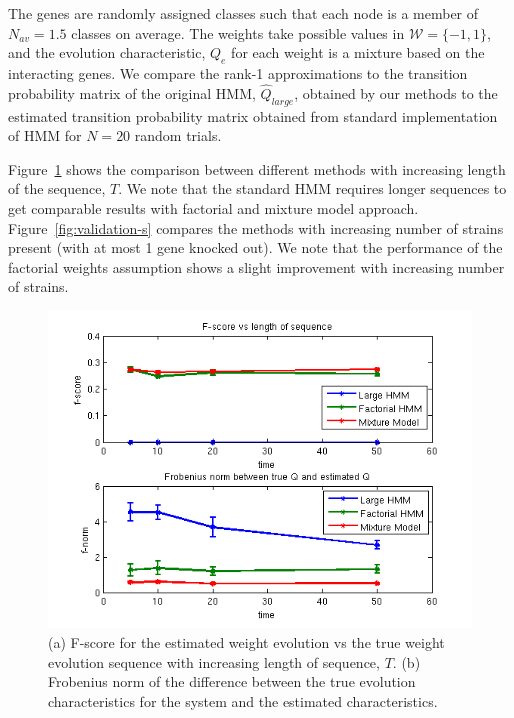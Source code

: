 \documentclass{bioinfo}
\begin{document}
The genes are randomly assigned classes  such that each
node is a member of $N_{av}=1.5$ classes on average. The weights take
possible values in ${\mathcal W} = \{-1, 1\}$, and the evolution characteristic, $Q_{e}$ for
each weight is a mixture based on the interacting genes.  We compare
the rank-1 approximations to the transition probability matrix of the
original HMM, $\hat{Q}_{large}$,  obtained by our methods to the
estimated transition probability matrix obtained from standard implementation of 
HMM for $N=20$ random trials. 

Figure~\ref{fig:validation-t} shows the comparison between different
methods with increasing length of the sequence, $T$. We note that the
standard HMM requires longer sequences to get comparable results with
factorial and mixture model approach. Figure~\ref{fig:validation-s} compares the
methods with increasing number of strains present (with at most 1 gene
knocked out). We note that the performance of the factorial weights
assumption shows a slight improvement with increasing number of
strains. 
\begin{figure}[h]
  \centering
  \includegraphics[scale=0.6]{results/mm_tvar}
  \caption{(a) F-score for the estimated weight evolution vs the true
    weight evolution sequence with increasing length of sequence, $T$. (b) Frobenius norm of the difference between the true
    evolution characteristics for the system and the estimated characteristics. }
  \label{fig:validation-t}
\end{figure}
\end{document}
